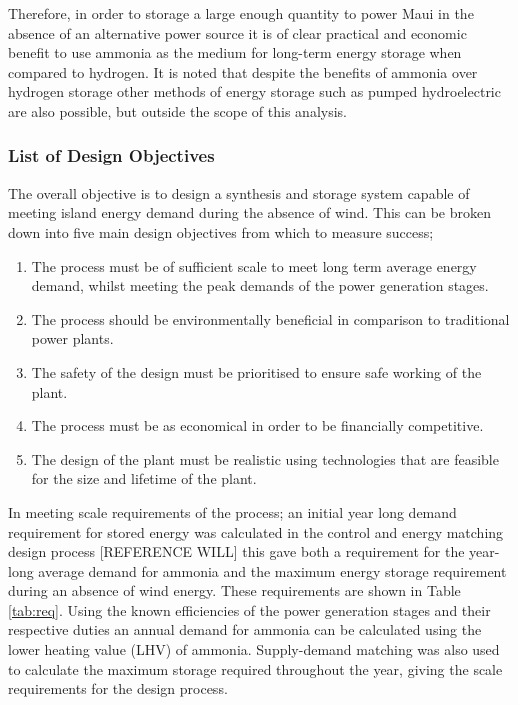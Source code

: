 \documentclass[11pt, a4paper]{article}
\begin{document}
{\begin{table}[!htbp]
\end{table}

Therefore, in order to storage a large enough quantity to power Maui in the absence of an alternative power source it is of clear practical and economic benefit to use ammonia as the medium for long-term energy storage when compared to hydrogen. It is noted that despite the benefits of ammonia over hydrogen storage other methods of energy storage such as pumped hydroelectric are also possible, but outside the scope of this analysis. 
\subsubsection{List of Design Objectives}

The overall objective is to design a synthesis and storage system capable of meeting island energy demand during the absence of wind. This can be broken down into five main design objectives from which to measure success;
\begin{enumerate}
	\item The process must be of sufficient scale to meet long term average energy demand, whilst meeting the peak demands of the power generation stages.
	\item The process should be environmentally beneficial in comparison to traditional power plants.
	\item The safety of the design must be prioritised to ensure safe working of the plant.
	\item The process must be as economical in order to be financially competitive.
	\item The design of the plant must be realistic using technologies that are feasible for the size and lifetime of the plant. 
\end{enumerate}

In meeting scale requirements of the process; an initial year long demand requirement for stored energy was calculated in the control and energy matching design process [REFERENCE WILL] this gave both a requirement for the year-long average demand for ammonia and the maximum energy storage requirement during an absence of wind energy. These requirements are shown in Table \ref{tab:req}. Using the known efficiencies of the power generation stages and their respective duties an annual demand for ammonia can be calculated using the lower heating value (LHV) of ammonia. Supply-demand matching was also used to calculate the maximum storage required throughout the year, giving the scale requirements for the design process. 

}
\end{document}
